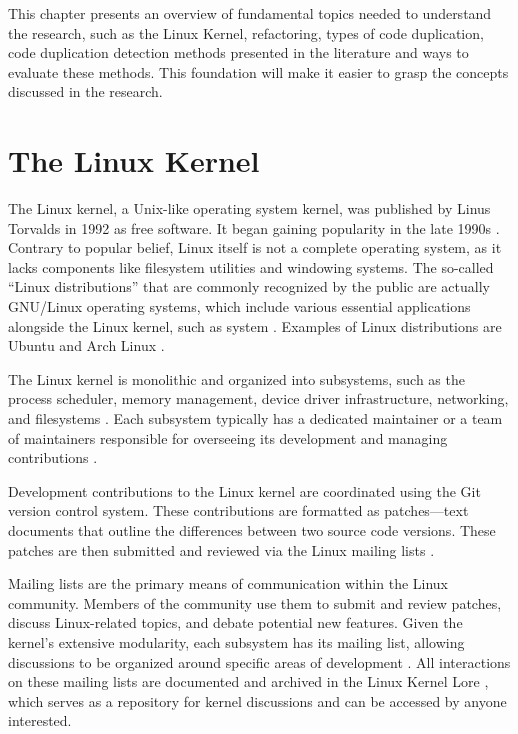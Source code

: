 \en

This chapter presents an overview of fundamental topics needed to understand 
the research, such as the Linux Kernel, refactoring, types of code duplication, 
code duplication detection methods presented in the literature and ways to 
evaluate these methods. This foundation will make it easier to grasp the 
concepts discussed in the research.

\section{The Linux Kernel}

The Linux kernel, a Unix-like operating system kernel, was published by Linus
Torvalds in 1992 as free software. It began gaining popularity in the late
1990s \citep{linuxbook}. Contrary to popular belief, Linux itself is not a
complete operating system, as it lacks components like filesystem utilities and
windowing systems. The so-called ``Linux distributions'' that are commonly
recognized by the public are actually GNU/Linux operating systems, which
include various essential applications alongside the Linux kernel,
such as system
\citep{gnuref}. Examples of Linux distributions are Ubuntu \citep{ubuntu} 
and Arch Linux \citep{archlinux}.

The Linux kernel is monolithic and organized into subsystems, such as
the process scheduler, memory management, device driver infrastructure,
networking, and filesystems \citep{melissa}. Each subsystem typically has a
dedicated maintainer or a team of maintainers responsible for overseeing its
development and managing contributions \citep{melissa}.

Development contributions to the Linux kernel are coordinated using the Git
version control system. These contributions are formatted as patches—text
documents that outline the differences between two source code versions.
These patches are then submitted and reviewed via the Linux mailing lists
\citep{melissa}.

Mailing lists are the primary means of communication within the Linux
community. Members of the community use them to submit and review patches,
discuss Linux-related topics, and debate potential new features. Given the
kernel's extensive modularity, each subsystem has its mailing list, allowing
discussions to be organized around specific areas of development
\citep{melissa}. All interactions on these mailing lists are documented and
archived in the Linux Kernel Lore \citep{linuxlore}, which serves as a
repository for kernel discussions and can be accessed by anyone interested.

